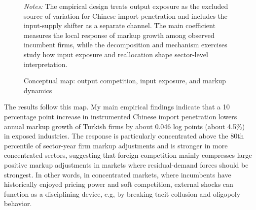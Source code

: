 \documentclass[12pt]{article}
\begin{document}
\begin{figure}[htbp]
\centering
{}
\caption{Conceptual map: output competition, input exposure, and markup dynamics}
\label{fig:conceptual_map}
\begin{minipage}{0.92\textwidth}
\footnotesize
\textit{Notes:} The empirical design treats output exposure as the excluded source of variation for Chinese import penetration and includes the input-supply shifter as a separate channel. The main coefficient measures the local response of markup growth among observed incumbent firms, while the decomposition and mechanism exercises study how input exposure and reallocation shape sector-level interpretation.
\end{minipage}
\end{figure}

The results follow this map. My main empirical findings indicate that a 10 percentage point increase in instrumented Chinese import penetration lowers annual markup growth of Turkish firms by about 0.046 log points (about 4.5\%) in exposed industries. The response is particularly concentrated above the 80th percentile of sector-year firm markup adjustments and is stronger in more concentrated sectors, suggesting that foreign competition mainly compresses large positive markup adjustments in markets where residual-demand forces should be strongest. In other words, in concentrated markets, where incumbents have historically enjoyed pricing power and soft competition, external shocks can function as a disciplining device, e.g, by breaking tacit collusion and oligopoly behavior.
\end{document}
